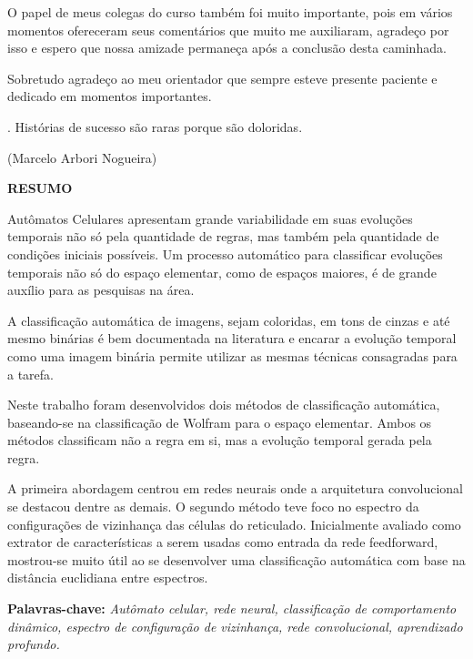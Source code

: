\documentclass[12pt,a4paper]{report}
\begin{document}
	O papel de meus colegas do curso também foi muito importante, pois em vários momentos ofereceram seus comentários que muito me auxiliaram, agradeço por isso e espero que nossa amizade permaneça após a conclusão desta caminhada.
	
	Sobretudo agradeço ao meu orientador que sempre esteve presente paciente e dedicado em momentos importantes.

	\newpage
	\begin{flushright}
		\color{white}.\color{black}
		\vskip 20.0cm
		Histórias de sucesso são raras porque são doloridas.

		(Marcelo Arbori Nogueira)
	\end{flushright}
    	
	\newpage
	\thispagestyle{plain}
	\begin{center}
		\large
		\textbf{RESUMO}
	\end{center}
	\renewcommand{\baselinestretch}{0.6666666}
	Autômatos Celulares apresentam grande variabilidade em suas evoluções temporais não só pela quantidade de regras, mas também pela quantidade de condições iniciais possíveis. Um processo automático para classificar evoluções temporais não só do espaço elementar, como de espaços maiores, é de grande auxílio para as pesquisas na área. 
	
	A classificação automática de imagens, sejam coloridas, em tons de cinzas e até mesmo binárias é bem documentada na literatura e encarar a evolução temporal como uma imagem binária permite utilizar as mesmas técnicas consagradas para a tarefa.
	
	Neste trabalho foram desenvolvidos dois métodos de classificação automática, baseando-se na classificação de Wolfram para o espaço elementar. Ambos os métodos classificam não a regra em si, mas a evolução temporal gerada pela regra.
	
	A primeira abordagem centrou em redes neurais onde a arquitetura convolucional se destacou dentre as demais. O segundo método teve foco no espectro da configurações de vizinhança das células do reticulado. Inicialmente avaliado como extrator de características a serem usadas como entrada da rede feedforward, mostrou-se muito útil ao se desenvolver uma classificação automática com base na distância euclidiana entre espectros.
	\\[0.5cm]
	\begin{flushleft}
		{\bf Palavras-chave:} {\it Autômato celular, rede neural, classificação de comportamento dinâmico, espectro de configuração de vizinhança, rede convolucional, aprendizado profundo.}
		\\[3.0cm]
	\end{flushleft}
	
\end{document}
